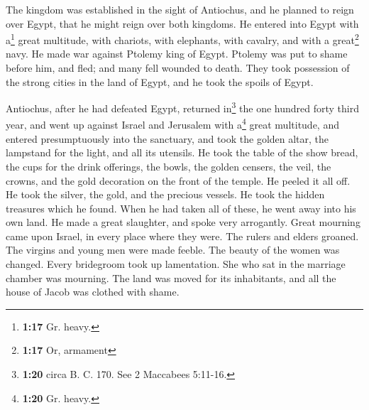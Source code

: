  The kingdom was established in the sight of Antiochus,
and he planned to reign over Egypt, that he might reign over both
kingdoms.  He entered into Egypt with a\footnote{\textbf{1:17}
  Gr. heavy.} great multitude, with chariots, with elephants, with
cavalry, and with a great\footnote{\textbf{1:17} Or, armament} navy.
 He made war against Ptolemy king of Egypt. Ptolemy was
put to shame before him, and fled; and many fell wounded to death.
 They took possession of the strong cities in the land of
Egypt, and he took the spoils of Egypt.

 Antiochus, after he had defeated Egypt, returned
in\footnote{\textbf{1:20} circa B. C. 170. See 2 Maccabees 5:11-16.} the
one hundred forty third year, and went up against Israel and Jerusalem
with a\footnote{\textbf{1:20} Gr. heavy.} great multitude,
 and entered presumptuously into the sanctuary, and took
the golden altar, the lampstand for the light, and all its utensils.
 He took the table of the show bread, the cups for the
drink offerings, the bowls, the golden censers, the veil, the crowns,
and the gold decoration on the front of the temple. He peeled it all
off.  He took the silver, the gold, and the precious
vessels. He took the hidden treasures which he found. 
When he had taken all of these, he went away into his own land. He made
a great slaughter, and spoke very arrogantly.  Great
mourning came upon Israel, in every place where they were.
 The rulers and elders groaned. The virgins and young men
were made feeble. The beauty of the women was changed. 
Every bridegroom took up lamentation. She who sat in the marriage
chamber was mourning.  The land was moved for its
inhabitants, and all the house of Jacob was clothed with shame.

